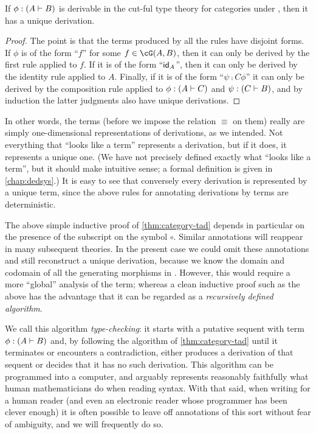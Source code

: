 \begin{lem}\label{thm:category-tad}
  If $\phi :(A\vdash B)$ is derivable in the cut-ful type theory for categories under \cG, then it has a unique derivation.
\end{lem}
\begin{proof}
  The point is that the terms produced by all the rules have disjoint forms.
  If $\phi$ is of the form ``$f$'' for some $f\in\cG(A,B)$, then it can only be derived by the first rule applied to $f$.
  If it is of the form ``$\mathsf{id}_A$'', then it can only be derived by the identity rule applied to $A$.
  Finally, if it is of the form ``$\psi\comp{C}\phi$'' it can only be derived by the composition rule applied to $\phi:(A\vdash C)$ and $\psi:(C\vdash B)$, and by induction the latter judgments also have unique derivations.
\end{proof}

In other words, the terms (before we impose the relation $\equiv$ on them) really are simply one-dimensional representations of derivations, as we intended.
Not everything that ``looks like a term'' represents a derivation, but if it does, it represents a unique one.
(We have not precisely defined exactly what ``looks like a term'', but it should make intuitive sense; a formal definition is given in \cref{chap:dedsys}.)
It is easy to see that conversely every derivation is represented by a unique term, since the above rules for annotating derivations by terms are deterministic.

The above simple inductive proof of \cref{thm:category-tad} depends in particular on the presence of the subscript on the symbol $\circ$.
Similar annotations will reappear in many subsequent theories.
In the present case we could omit these annotations and still reconstruct a unique derivation, because we know the domain and codomain of all the generating morphisms in \cG.
However, this would require a more ``global'' analysis of the term; whereas a clean inductive proof such as the above has the advantage that it can be regarded as a \textit{recursively defined algorithm}.

We call this algorithm \emph{type-checking}: it starts with a putative sequent with term $\phi :(A\vdash B)$ and, by following the algorithm of \cref{thm:category-tad} until it terminates or encounters a contradiction, either produces a derivation of that sequent or decides that it has no such derivation.
This algorithm can be programmed into a computer, and arguably represents reasonably faithfully what human mathematicians do when reading syntax.
With that said, when writing for a human reader (and even an electronic reader whose programmer has been clever enough) it is often possible to leave off annotations of this sort without fear of ambiguity, and we will frequently do so.

